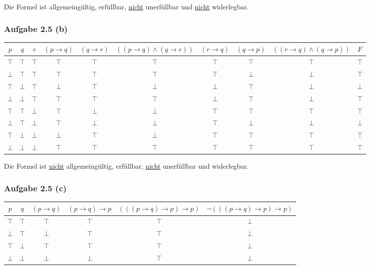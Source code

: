 Die Formel ist allgemeingültig, erfüllbar, \underline{nicht} unerfüllbar und \underline{nicht} widerlegbar.

\subsubsection{Aufgabe 2.5 (b)}
\begin{landscape}
	\begin{tabular}{c|c|c||c|c|c|c|c|c|c}
		$p$ & $q$ & $r$ & $(p\to q)$ & $(q\to r)$ & $((p\to q)\wedge(q\to r))$ & $(r\to q)$ & $(q\to p)$ & $((r\to q)\wedge(q\to p))$ & $F$ \\ \hline
		$\top$ & $\top$ & $\top$ & $\top$ & $\top$ & $\top$ & $\top$ & $\top$ & $\top$ & $\top$\\
		$\bot$ & $\top$ & $\top$ & $\top$ & $\top$ & $\top$ & $\top$ & $\bot$ & $\bot$ & $\top$\\
		$\top$ & $\bot$ & $\top$ & $\bot$ & $\top$ & $\bot$ & $\bot$ & $\top$ & $\bot$ & $\bot$\\
		$\bot$ & $\bot$ & $\top$ & $\top$ & $\top$ & $\top$ & $\bot$ & $\top$ & $\bot$ & $\top$\\ \hline
		$\top$ & $\top$ & $\bot$ & $\top$ & $\bot$ & $\bot$ & $\top$ & $\top$ & $\top$ & $\top$\\
		$\bot$ & $\top$ & $\bot$ & $\top$ & $\bot$ & $\bot$ & $\top$ & $\bot$ & $\bot$ & $\bot$\\
		$\top$ & $\bot$ & $\bot$ & $\bot$ & $\top$ & $\bot$ & $\top$ & $\top$ & $\top$ & $\top$\\
		$\bot$ & $\bot$ & $\bot$ & $\top$ & $\top$ & $\top$ & $\top$ & $\top$ & $\top$ & $\top$
	\end{tabular}
\end{landscape}

Die Formel ist \underline{nicht} allgemeingültig, erfüllbar, \underline{nicht} unerfüllbar und widerlegbar.

\subsubsection{Aufgabe 2.5 (c)}
\begin{tabular}{c|c||c|c|c|c}
	$p$ & $q$ & $(p\to q)$ & $(p\to q)\to p$ & $(((p\to q)\to p)\to p)$ & $\neg(((p\to q)\to p)\to p)$\\ \hline
	$\top$ & $\top$ & $\top$ & $\top$ & $\top$ & $\bot$\\
	$\bot$ & $\top$ & $\bot$ & $\top$ & $\top$ & $\bot$\\
	$\top$ & $\bot$ & $\top$ & $\top$ & $\top$ & $\bot$\\
	$\bot$ & $\bot$ & $\bot$ & $\bot$ & $\top$ & $\bot$\\
\end{tabular}

